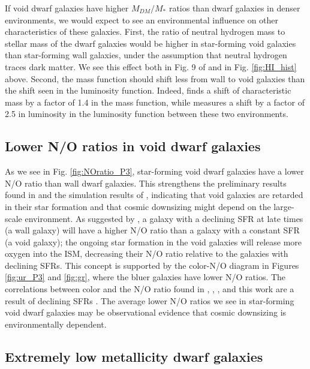 If void dwarf galaxies have higher $M_{DM}/M_*$ ratios than dwarf galaxies in 
denser environments, we would expect to see an environmental influence on other 
characteristics of these galaxies.  First, the ratio of neutral hydrogen mass to 
stellar mass of the dwarf galaxies would be higher in star-forming void galaxies 
than star-forming wall galaxies, under the assumption that neutral hydrogen 
traces dark matter.  We see this effect both in Fig. 9 of \cite{Moorman16} and 
in Fig. \ref{fig:HI_hist} above.  Second, the  mass function should 
shift less from wall to void galaxies than the shift seen in the luminosity 
function.  Indeed, \cite{Moorman16} finds a shift of characteristic  
mass by a factor of 1.4 in the  mass function, while \cite{Hoyle05} 
measures a shift by a factor of 2.5 in luminosity in the luminosity function 
between these two environments.


\subsection{Lower N/O ratios in void dwarf galaxies}

As we see in Fig. \ref{fig:NOratio_P3}, star-forming void dwarf galaxies have a 
lower N/O ratio than wall dwarf galaxies.  This strengthens the preliminary 
results found in \cite{Douglass17b} and the simulation results of \cite{Cen11}, 
indicating that void galaxies are retarded in their star formation and that 
cosmic downsizing might depend on the large-scale environment.  As suggested by 
\cite{vanZee06a}, a galaxy with a declining SFR at late times (a wall galaxy) 
will have a higher N/O ratio than a galaxy with a constant SFR (a void galaxy); 
the ongoing star formation in the void galaxies will release more oxygen into 
the ISM, decreasing their N/O ratio relative to the galaxies with declining 
SFRs.  This concept is supported by the color-N/O diagram in Figures 
\ref{fig:ur_P3} and \ref{fig:gr}, where the bluer galaxies have lower N/O 
ratios.  The correlations between color and the N/O ratio found in 
\cite{vanZee06a}, \cite{Berg12}, \cite{Douglass17b}, and this work are a result 
of declining SFRs \citep{vanZee06a}.  The average lower N/O ratios we see in 
star-forming void dwarf galaxies may be observational evidence that cosmic 
downsizing is environmentally dependent.


\subsection{Extremely low metallicity dwarf galaxies}

